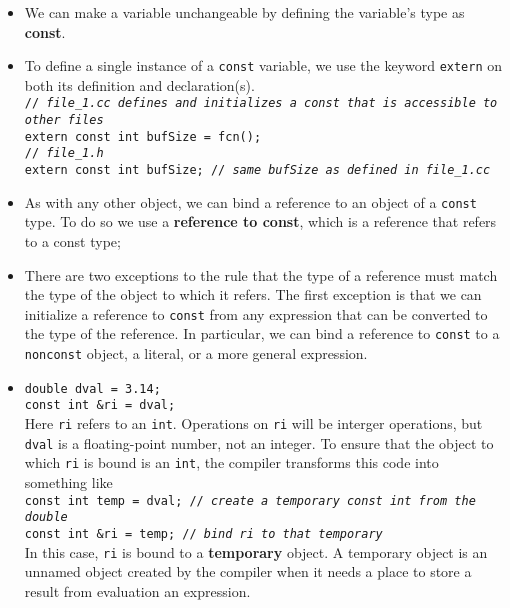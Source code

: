 \begin{itemize}
\item We can make a variable unchangeable by defining the variable's type as \textbf{const}.

\item To define a single instance of a \texttt{const} variable, we use the keyword \texttt{extern} on both its definition and declaration(s).\\\hspace*{1em}\texttt{// \textit{file\_1.cc defines and initializes a const that is accessible to other files}}\\\hspace*{1em}\texttt{extern const int bufSize = fcn();}\\\hspace*{1em}\texttt{// \textit{file\_1.h}}\\\hspace*{1em}\texttt{extern const int bufSize; // \textit{same bufSize as defined in file\_1.cc}}

\item As with any other object, we can bind a reference to an object of a \texttt{const} type. To do so we use a \textbf{reference to const}, which is a reference that refers to a const type;

\item There are two exceptions to the rule that the type of a reference must match the type of the object to which it refers. The first exception is that we can initialize a reference to \texttt{const} from any expression that can be converted to the type of the reference. In particular, we can bind a reference to \texttt{const} to a \texttt{nonconst} object, a literal, or a more general expression.


\item \hspace*{1em}\texttt{double dval = 3.14;}\\\hspace*{1em}\texttt{const int \&ri = dval;}\\Here \texttt{ri} refers to an \texttt{int}. Operations on \texttt{ri} will be interger operations, but \texttt{dval} is a floating-point number, not an integer. To ensure that the object to which \texttt{ri} is bound is an \texttt{int}, the compiler transforms this code into something like\\\hspace*{1em}\texttt{const int temp = dval; // \textit{create a temporary const int from the double}}\\\hspace*{1em}\texttt{const int \&ri = temp; // \textit{bind ri to that temporary}}\\In this case, \texttt{ri} is bound to a \textbf{temporary} object. A temporary object is an unnamed object created by the compiler when it needs a place to store a result from evaluation an expression.


\end{itemize}

